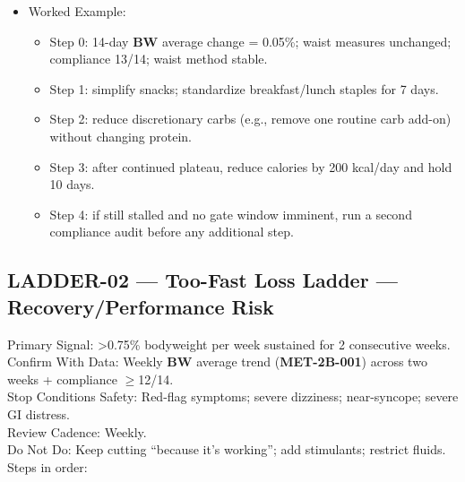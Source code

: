 \documentclass[10pt]{article}
\begin{document}
\begin{itemize}
\begin{itemize}
  \item Worked Example:
    \begin{itemize}
    \item Step 0: 14-day \textbf{BW} average change = 0.05\%; waist measures unchanged; compliance 13/14; waist method stable.
    \item Step 1: simplify snacks; standardize breakfast/lunch staples for 7 days.
    \item Step 2: reduce discretionary carbs (e.g., remove one routine carb add-on) without changing protein.
    \item Step 3: after continued plateau, reduce calories by 200 kcal/day and hold 10 days.
    \item Step 4: if still stalled and no gate window imminent, run a second compliance audit before any additional step.
    \end{itemize}
  \end{itemize}
\end{itemize}

\newpage

\subsection*{LADDER-02 — Too-Fast Loss Ladder — Recovery/Performance Risk}
{}

Primary Signal: \textgreater0.75\% bodyweight per week sustained for 2 consecutive weeks.\\
Confirm With Data: Weekly \textbf{BW} average trend (\textbf{MET-2B-001}) across two weeks + compliance $\geq$12/14.\\
Stop Conditions Safety: Red-flag symptoms; severe dizziness; near-syncope; severe GI distress.\\
Review Cadence: Weekly.\\
Do Not Do: Keep cutting “because it’s working”; add stimulants; restrict fluids.\\
Steps in order:
\end{document}
